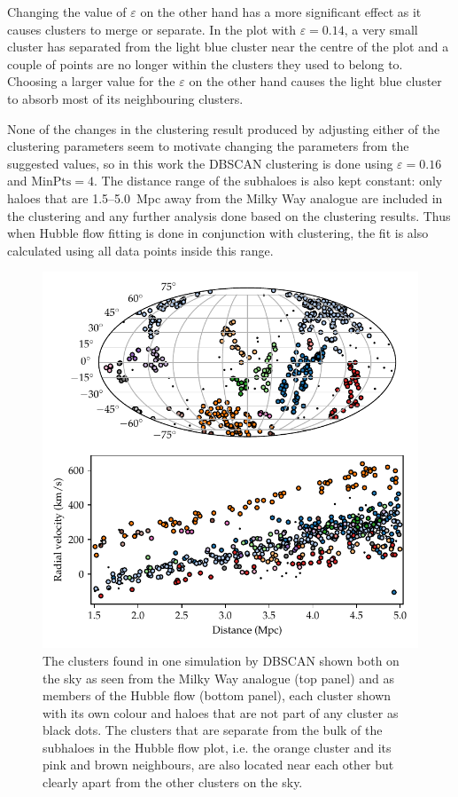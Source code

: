 \documentclass[english, oneside]{HYgradu}
\begin{document}
Changing the value of $\varepsilon$ on the other hand has a more significant effect as it causes clusters to merge or separate. In the plot with $\varepsilon = 0.14$, a very small cluster has separated from the light blue cluster near the centre of the plot and a couple of points are no longer within the clusters they used to belong to. Choosing a larger value for the $\varepsilon$ on the other hand causes the light blue cluster to absorb most of its neighbouring clusters.

None of the changes in the clustering result produced by adjusting either of the clustering parameters seem to motivate changing the parameters from the suggested values, so in this work the DBSCAN clustering is done using $\varepsilon=0.16$ and $\mathrm{MinPts}=4$. The distance range of the subhaloes is also kept constant: only haloes that are 1.5--5.0~Mpc away from the Milky Way analogue are included in the clustering and any further analysis done based on the clustering results. Thus when Hubble flow fitting is done in conjunction with clustering, the  fit is also calculated using all data points inside this range.

\begin{figure}
    \centering
    \includegraphics{kuvat/mollweide+hubble.pdf}
    \caption{The clusters found in one simulation by DBSCAN shown both on the sky as seen from the Milky Way analogue (top panel) and as members of the Hubble flow (bottom panel), each cluster shown with its own colour and haloes that are not part of any cluster as black dots. The clusters that are separate from the bulk of the subhaloes in the Hubble flow plot, i.e. the orange cluster and its pink and brown neighbours, are also located near each other but clearly apart from the other clusters on the sky.}\label{fig:mollweide+hubble}
\end{figure}
\end{document}
